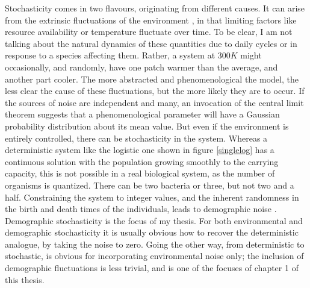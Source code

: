 Stochasticity comes in two flavours, originating from different causes. 
It can arise from the extrinsic fluctuations of the environment \cite{Kamenev2008a,Chotibut2017b}, in that limiting factors like resource availability or temperature fluctuate over time. 
To be clear, I am not talking about the natural dynamics of these quantities due to daily cycles or in response to a species affecting them. 
Rather, a system at $300K$ might occasionally, and randomly, have one patch warmer than the average, and another part cooler. 
The more abstracted and phenomenological the model, the less clear the cause of these fluctuations, but the more likely they are to occur. 
If the sources of noise are independent and many, an invocation of the central limit theorem suggests that a phenomenological parameter will have a Gaussian probability distribution about its mean value. 
But even if the environment is entirely controlled, there can be stochasticity in the system. 
Whereas a deterministic system like the logistic one shown in figure \ref{singlelog} has a continuous solution with the population growing smoothly to the carrying capacity, this is not possible in a real biological system, as the number of organisms is quantized. 
There can be two bacteria or three, but not two and a half. 
Constraining the system to integer values, and the inherent randomness in the birth and death times of the individuals, leads to demographic noise \cite{Assaf2006,Gottesman2012,Dobrinevski2012,Gabel2013,Fisher2014,Constable2015,Lin2012,Chotibut2015,Young2018}. 
Demographic stochasticity is the focus of my thesis. 
For both environmental and demographic stochasticity it is usually obvious how to recover the deterministic analogue, by taking the noise to zero. %
Going the other way, from deterministic to stochastic, is obvious for incorporating environmental noise only; the inclusion of demographic fluctuations is less trivial, and is one of the focuses of chapter 1 of this thesis. %

